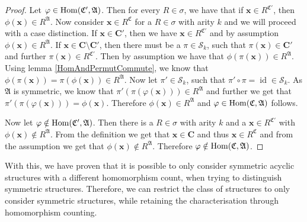 \begin{proof}
	Let $\varphi\in \operatorname{Hom}(\mathfrak C',\mathfrak A)$.
	Then for every $R\in \sigma$, we have that if $\mathbf x\in R^{\mathfrak C'}$, then $\phi(\mathbf x)\in R^{\mathfrak A}$.
	Now consider $\mathbf x\in R^{\mathfrak C}$ for a $R\in \sigma$ with arity $k$ and we will proceed with a case distinction.
	If $\mathbf x\in \mathbf{C'}$, then we have $\mathbf x\in R^{\mathfrak C'}$ and by assumption $\phi(\mathbf x)\in R^{\mathfrak A}$.
	If $\mathbf x\in \mathbf C\setminus\mathbf{C'}$, then there must be a $\pi\in \mathcal S_k$, such that $\pi(\mathbf x)\in \mathbf{C'}$ and further $\pi(\mathbf x)\in R^{\mathfrak C'}$.
	Then by assumption we have that $\phi(\pi(\mathbf x))\in R^{\mathfrak A}$.
	Using lemma \ref{HomAndPermutCommute}, we know that $\phi(\pi(\mathbf x))=\pi(\phi(\mathbf x))\in R^{\mathfrak A}$.
	Now let $\pi'\in \mathcal S_k$, such that $\pi'\circ\pi=\operatorname{id}\in \mathcal S_k$.
	As $\mathfrak A$ is symmetric, we know that $\pi'(\pi(\varphi(\mathbf x)))\in R^{\mathfrak A}$ and further we get that $\pi'(\pi(\varphi(\mathbf x)))=\phi(\mathbf x)$.
	Therefore $\phi(\mathbf x)\in R^{\mathfrak A}$ and $\varphi\in\operatorname{Hom}(\mathfrak C,\mathfrak A)$ follows.
	
	Now let $\varphi\notin\operatorname{Hom}(\mathfrak C',\mathfrak A)$.
	Then there is a $R\in\sigma$ with arity $k$ and a $\mathbf x\in R^{\mathfrak C'}$ with $\phi(\mathbf x)\notin R^{\mathfrak A}$.
	From the definition we get that $\mathbf x\in \mathbf{C}$ and thus $\mathbf x \in R^{\mathfrak C}$ and from the assumption we get that $\phi(\mathbf x)\notin R^{\mathfrak A}$.
	Therefore $\varphi\notin \operatorname{Hom}(\mathfrak C,\mathfrak A)$.
\end{proof}

With this, we have proven that it is possible to only consider symmetric acyclic structures with a different homomorphism count, when trying to distinguish symmetric structures.
Therefore, we can restrict the class of structures to only consider symmetric structures, while retaining the characterisation through homomorphism counting.



